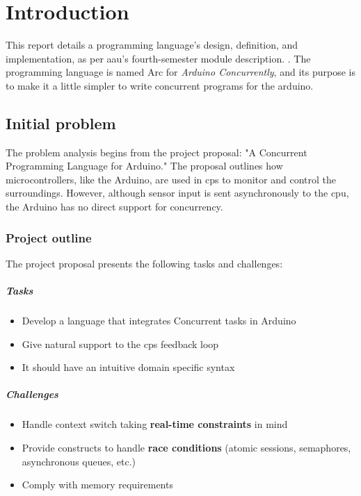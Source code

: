 \chapter{Introduction}\label{cha:introduction}
This report details a programming language’s design, definition, and implementation, as per \gls{aau}'s fourth-semester module description. \cite{AAU_Modules_P4}. The programming language is named Arc for \textit{Arduino Concurrently}, and its purpose is to make it a little simpler to write concurrent programs for the arduino.

\section{Initial problem}\label{sec:initialproblem}
The problem analysis begins from the project proposal: "A Concurrent Programming Language for Arduino." The proposal outlines how microcontrollers, like the Arduino, are used in \gls{cps} to monitor and control the surroundings. However, although sensor input is sent asynchronously to the \gls{cpu}, the Arduino has no direct support for concurrency.

\subsection{Project outline}
The project proposal presents the following tasks and challenges:

\paragraph{Tasks}
\begin{itemize}
    \item Develop a language that integrates Concurrent tasks in Arduino
    \item Give natural support to the \gls{cps} feedback loop
    \item It should have an intuitive domain specific syntax
\end{itemize}

\paragraph{Challenges}
\begin{itemize}
    \item Handle context switch taking \textbf{real-time constraints} in mind
    \item Provide constructs to handle \textbf{race conditions} (atomic sessions, semaphores, asynchronous queues, etc.)
    \item Comply with memory requirements
\end{itemize}

